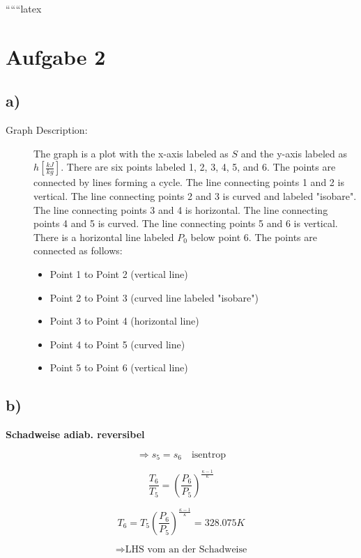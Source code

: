 
``````latex


\section*{Aufgabe 2}

\subsection*{a)}

\begin{description}
    \item[Graph Description:] The graph is a plot with the x-axis labeled as $S$ and the y-axis labeled as $h \left[ \frac{kJ}{kg} \right]$. There are six points labeled 1, 2, 3, 4, 5, and 6. The points are connected by lines forming a cycle. The line connecting points 1 and 2 is vertical. The line connecting points 2 and 3 is curved and labeled "isobare". The line connecting points 3 and 4 is horizontal. The line connecting points 4 and 5 is curved. The line connecting points 5 and 6 is vertical. There is a horizontal line labeled $P_0$ below point 6. The points are connected as follows:
    \begin{itemize}
        \item Point 1 to Point 2 (vertical line)
        \item Point 2 to Point 3 (curved line labeled "isobare")
        \item Point 3 to Point 4 (horizontal line)
        \item Point 4 to Point 5 (curved line)
        \item Point 5 to Point 6 (vertical line)
    \end{itemize}
\end{description}

\subsection*{b)}

\textbf{Schadweise adiab. reversibel}

\[
\Rightarrow s_5 = s_6 \quad \text{isentrop}
\]

\[
\frac{T_6}{T_5} = \left( \frac{P_6}{P_5} \right)^{\frac{\kappa - 1}{\kappa}}
\]

\[
T_6 = T_5 \left( \frac{P_6}{P_5} \right)^{\frac{\kappa - 1}{\kappa}} = 328.075 K
\]

\[
\Rightarrow \text{LHS vom an der Schadweise}
\]

